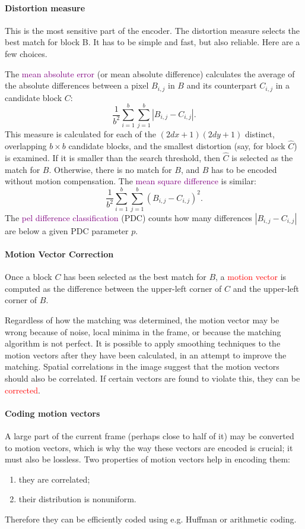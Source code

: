 \documentclass[a4paper, 11pt, openany]{book}
\numberwithin{equation}{section}
\theoremstyle{plain}
\theoremstyle{definition}
\newcommand{\Important}[1]{\textcolor{red}{#1}}
\newcommand{\Define}[1]{\textcolor{purple}{#1}}
\begin{document}
\paragraph{Distortion measure}
This is the most sensitive part of the encoder. The distortion
measure selects the best match for block B. It has to be simple and fast, but also
reliable. Here are a few choices.

The \Define{mean absolute error} (or mean absolute difference) calculates the average of the
absolute differences between a pixel $B_{i,j}$ in $B$ and its counterpart $C_{i,j}$ in a candidate block $C$:
\[
    \frac{1}{b^2} \sum_{i=1}^b \sum_{j=1}^b \left| B_{i,j} - C_{i,j}  \right|.
\]
This measure is calculated for each of the $(2dx+1)(2dy +1)$ distinct, overlapping
$b \times b$ candidate blocks, and the smallest distortion (say, for block $\hat{C}$) is examined. If it is smaller than the search threshold, then $\hat{C}$ is selected as the match for $B$. Otherwise, there is no match for $B$, and $B$ has to be encoded without motion compensation. The \Define{mean square difference} is similar:
\[
    \frac{1}{b^2} \sum_{i=1}^b \sum_{j=1}^b ( B_{i,j} - C_{i,j}  )^2.
\]
The \Define{pel difference classification} (PDC) counts how many differences $|B_{i,j} - C_{i,j}|$ are below a given PDC parameter $p$.

\paragraph{Motion Vector Correction}
Once a block $C$ has been selected as the best match for $B$, a \Important{motion vector} is computed as the difference between the upper-left corner of $C$ and the upper-left corner of $B$. 

Regardless of how the matching was determined, the motion vector may be wrong because of noise, local minima in the frame, or because the matching algorithm is not perfect. It is possible to apply smoothing techniques to the motion vectors after they have been calculated, in an attempt to improve the matching. Spatial correlations in the image suggest that the motion vectors should also be correlated. If certain vectors are found to violate this, they can be \Important{corrected}.

\paragraph{Coding motion vectors}
A large part of the current frame (perhaps close to
half of it) may be converted to motion vectors, which is why the way these vectors are
encoded is crucial; it must also be lossless. Two properties of motion vectors help in
encoding them: 
\begin{enumerate}
    \item they are correlated;
    \item their distribution is nonuniform.
\end{enumerate}
Therefore they can be efficiently coded using e.g. Huffman or arithmetic coding.
\end{document}
